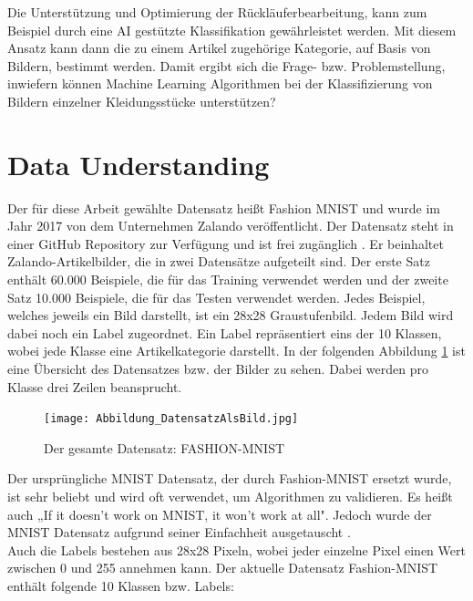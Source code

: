 \documentclass[12pt]{scrreprt}
\begin{document}
Die Unterstützung und Optimierung der Rückläuferbearbeitung, kann zum Beispiel durch eine AI gestützte Klassifikation gewährleistet werden. Mit diesem Ansatz kann dann die zu einem Artikel zugehörige Kategorie, auf Basis von Bildern, bestimmt werden. Damit ergibt sich die Frage- bzw. Problemstellung, inwiefern können Machine Learning Algorithmen bei der Klassifizierung von Bildern einzelner Kleidungsstücke unterstützen?
	
\section{Data Understanding}
	
Der für diese Arbeit gewählte Datensatz heißt Fashion MNIST und wurde im Jahr 2017 von dem Unternehmen Zalando veröffentlicht. Der Datensatz steht in einer GitHub Repository zur Verfügung und ist frei zugänglich \cite{Zalando2017}. Er beinhaltet Zalando-Artikelbilder, die in zwei Datensätze aufgeteilt sind. Der erste Satz enthält 60.000 Beispiele, die für das Training verwendet werden und der zweite Satz 10.000 Beispiele, die für das Testen verwendet werden. Jedes Beispiel, welches jeweils ein Bild darstellt, ist ein 28x28 Graustufenbild. Jedem Bild wird dabei noch ein Label zugeordnet. Ein Label repräsentiert eins der 10 Klassen, wobei jede Klasse eine Artikelkategorie darstellt. In der folgenden Abbildung \ref{fig:fig7} ist eine Übersicht des Datensatzes bzw. der Bilder zu sehen. Dabei werden pro Klasse drei Zeilen beansprucht.\\
	
\begin{figure}[h!]
	\centering
	\texttt{[image: Abbildung\_DatensatzAlsBild.jpg]}
	\caption{Der gesamte Datensatz: FASHION-MNIST \cite{Abbildung7}}
	\label{fig:fig7}
\end{figure}
	
Der ursprüngliche MNIST Datensatz, der durch Fashion-MNIST ersetzt wurde, ist sehr beliebt und wird oft verwendet, um Algorithmen zu validieren. Es heißt auch „If it doesn't work on MNIST, it won't work at all". Jedoch wurde der MNIST Datensatz aufgrund seiner Einfachheit ausgetauscht \cite{Zalando2017}.\\
	
Auch die Labels bestehen aus 28x28 Pixeln, wobei jeder einzelne Pixel einen Wert zwischen 0 und 255 annehmen kann. Der aktuelle Datensatz Fashion-MNIST enthält folgende 10 Klassen bzw. Labels:
\end{document}
